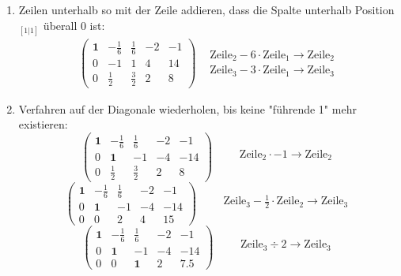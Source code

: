 \documentclass[11pt, openany]{book}
\begin{document}
\begin{enumerate}
    \item Zeilen unterhalb so mit der Zeile addieren, dass die Spalte unterhalb Position$_{[1|1]}$ überall 0 ist:
    {\small
    \[
    \begin{array}{c|c}
      \left(\begin{array}{cccc|c}
          \textbf{1} & -\frac{1}{6} & \frac{1}{6} & -2 & -1 \\
          0 & -1 & 1 & 4 & 14 \\
          0 & \frac{1}{2} & \frac{3}{2} & 2 & 8
        \end{array}\right) & \begin{array}{l}
          \text{Zeile}_2 - 6\cdot\text{Zeile}_1 \to \text{Zeile}_2 \\
          \text{Zeile}_3 - 3\cdot\text{Zeile}_1 \to \text{Zeile}_3
        \end{array}
    \end{array}
    \]}
    \item Verfahren auf der Diagonale wiederholen, bis keine "führende 1" mehr existieren:
    {\small
    \[
    \left(
    \begin{array}{cccc|c}
      \textbf{1} & -\frac{1}{6} & \frac{1}{6} & -2 & -1 \\
      0 & \textbf{1} & -1 & -4 & -14 \\
      0 & \frac{1}{2} & \frac{3}{2} & 2 & 8
    \end{array}
    \right) \qquad \begin{array}{c}
      \text{Zeile}_2 \cdot -1 \to \text{Zeile}_2 \\
    \end{array}
    \]
    \[
    \left(
    \begin{array}{cccc|c}
      \textbf{1} & -\frac{1}{6} & \frac{1}{6} & -2 & -1 \\
      0 & \textbf{1} & -1 & -4 & -14 \\
      0 & 0 & 2 & 4 & 15
    \end{array}
    \right) \qquad \begin{array}{c}
      \text{Zeile}_3 - \frac{1}{2}\cdot \text{Zeile}_2 \to \text{Zeile}_3 \\
    \end{array}
    \]
    \[
    \left(
    \begin{array}{cccc|c}
      \textbf{1} & -\frac{1}{6} & \frac{1}{6} & -2 & -1 \\
      0 & \textbf{1} & -1 & -4 & -14 \\
      0 & 0 & \textbf{1} & 2 & 7.5
    \end{array}
    \right) \qquad \begin{array}{c}
      \text{Zeile}_3 \div 2 \to \text{Zeile}_3 \\
    \end{array}
    \]}  
    

\end{enumerate}
\end{document}

